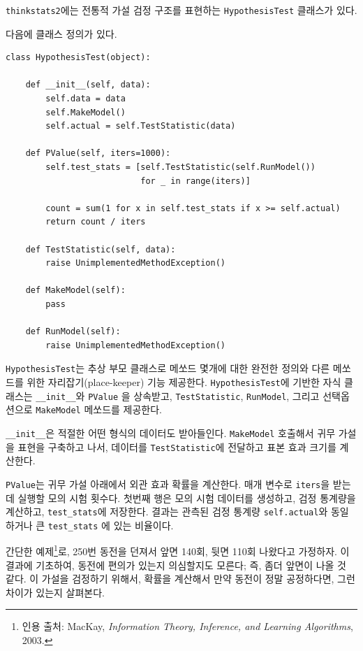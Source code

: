 {\tt thinkstats2}에는 전통적 가설 검정 구조를 표현하는 {\tt HypothesisTest} 클래스가 있다.

다음에 클래스 정의가 있다.

\begin{verbatim}
class HypothesisTest(object):

    def __init__(self, data):
        self.data = data
        self.MakeModel()
        self.actual = self.TestStatistic(data)

    def PValue(self, iters=1000):
        self.test_stats = [self.TestStatistic(self.RunModel()) 
                           for _ in range(iters)]

        count = sum(1 for x in self.test_stats if x >= self.actual)
        return count / iters

    def TestStatistic(self, data):
        raise UnimplementedMethodException()

    def MakeModel(self):
        pass

    def RunModel(self):
        raise UnimplementedMethodException()
\end{verbatim}

{\tt HypothesisTest}는 추상 부모 클래스로 메쏘드 몇개에 대한 완전한 정의와 
다른 메쏘드를 위한 자리잡기(place-keeper) 기능 제공한다.
{\tt HypothesisTest}에 기반한 자식 클래스는 \verb"__init__"와 {\tt PValue} 을 상속받고, {\tt TestStatistic}, {\tt RunModel}, 그리고 선택옵션으로 {\tt MakeModel} 메쏘드를 제공한다.

\verb"__init__"은 적절한 어떤 형식의 데이터도 받아들인다.
{\tt MakeModel} 호출해서 귀무 가설을 표현을 구축하고 나서,
데이터를 {\tt TestStatistic}에 전달하고 표본 효과 크기를 계산한다.


{\tt PValue}는 귀무 가설 아래에서 외관 효과 확률을 계산한다.
매개 변수로 {\tt iters}을 받는데 실행할 모의 시험 횟수다.
첫번째 행은 모의 시험 데이터를 생성하고, 검정 통계량을 계산하고, 
\verb"test_stats"에 저장한다.
결과는 관측된 검정 통계량 {\tt self.actual}와 동일하거나 큰 \verb"test_stats" 에 있는 비율이다.

간단한 예제\footnote{인용 출처: MacKay, {\it Information
Theory, Inference, and Learning Algorithms}, 2003.}로, 250번 동전을 던져서 앞면 140회, 뒷면 110회 나왔다고 가정하자.
이 결과에 기초하여, 동전에 편의가 있는지 의심할지도 모른다; 즉, 좀더 앞면이 나올 것 같다.
이 가설을 검정하기 위해서, 확률을 계산해서 만약 동전이 정말 공정하다면, 그런 차이가 있는지 살펴본다.

